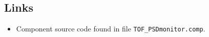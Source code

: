 \subsection*{Links}
\begin{itemize}
  \item Component source code found in file \texttt{TOF\_PSDmonitor.comp}.
\end{itemize}
